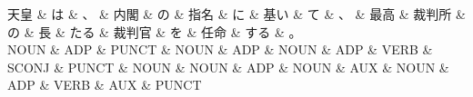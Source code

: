 \documentclass[tikz,border=5pt]{standalone}
\begin{document}
\normalsize
\begin{dependency}[edge unit distance=12.0pt]
    \begin{deptext}[column sep=1em]
        天皇 \& は \& 、 \& 内閣 \& の \& 指名 \& に \& 基い \& て \& 、 \& 最高 \& 裁判所 \& の \& 長 \& たる \& 裁判官 \& を \& 任命 \& する \& 。\\
        NOUN \& ADP \& PUNCT \& NOUN \& ADP \& NOUN \& ADP \& VERB \& SCONJ \& PUNCT \& NOUN \& NOUN \& ADP \& NOUN \& AUX \& NOUN \& ADP \& VERB \& AUX \& PUNCT\\
    \end{deptext}
\end{dependency}
\end{document}
